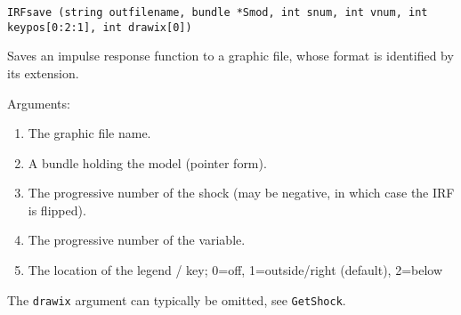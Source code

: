 \documentclass[a4paper,10pt]{article}
\newenvironment{funcdoc}[1]
{\noindent\hrulefill\newline\nopagebreak\texttt{#1}%
\nopagebreak\par\noindent\hrulefill%
\nopagebreak\par\nopagebreak\smallskip\nopagebreak\par}
{\bigskip}
\begin{document}

\begin{funcdoc}{IRFsave (string outfilename, bundle *Smod, int snum, int vnum, 
int keypos[0:2:1], int drawix[0])}
   \noindent Saves an impulse response function to a graphic file, whose format is
  identified by its extension. 
    
  \noindent Arguments:
  
  \begin{enumerate}
  \item The graphic file name.
  \item A bundle holding the model (pointer form).
  \item The progressive number of the shock (may be negative, in which
    case the IRF is flipped).
  \item The progressive number of the variable.
  \item The location of the legend / key; 0=off, 1=outside/right (default), 2=below
  \end{enumerate}
  
   The \texttt{drawix} argument can typically be omitted, see \texttt{GetShock}.
\end{funcdoc}
\end{document}
